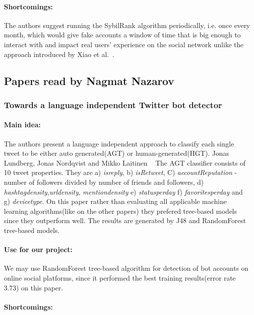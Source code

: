 \paragraph{Shortcomings:}
The authors suggest running the SybilRank algorithm periodically, i.e. once every month, which would give fake accounts a window of time that is big enough to interact with and impact real users' experience on the social network unlike the approach introduced by Xiao et al.~\cite{xiao2015detecting}.

\subsection{Papers read by Nagmat Nazarov}



\subsubsection{Towards a language independent Twitter bot detector}

\paragraph{Main idea:}
The authors present a language independent approach to classify each single tweet to be either auto generated(AGT) or human-generated(HGT). Jonas Lundberg, Jonas Nordqvist and Mikko Laitinen ~\cite{lundberg2019towards} The AGT classifier consists of 10 tweet properties. They are a) \textit{isreply}, b) \textit{isRetweet}, C) \textit{accountReputation} - number of followers divided by number of friends and followers, d) \textit{hashtagdensity},\textit{urldensity}, \textit{mentiondensity} e) \textit{statusperday} f) \textit{favoritesperday} and g) \textit{devicetype}. 
On this paper rather than evaluating all applicable machine learning algorithms(like on the other papers) they prefered tree-based models since they outperform well. The results are generated by J48 and RandomForest tree-based models.   
\paragraph{Use for our project:}
We may use RandomForest tree-based algorithm for detection of bot accounts on online social platforms, since it performed the best training results(error rate 3.73\text{\%}) on this paper.  
\paragraph{Shortcomings:}





